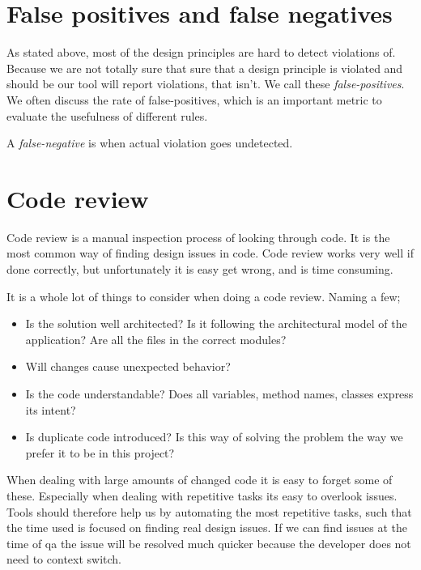 \documentclass{report}
\begin{document}
\section{False positives and false negatives}
As stated above, most of the design principles are hard to detect violations of. Because we are not totally sure that sure that a design principle is violated and should be our tool will report violations, that isn't. We call these \textit{false-positives}. We often discuss the rate of false-positives, which is an important metric to evaluate the usefulness of different rules.

A \textit{false-negative} is when actual violation goes undetected. 



\section{Code review}
\label{code-review}
Code review is a manual inspection process of looking through code. It is the most common way of finding design issues in code. Code review works very well if done correctly, but unfortunately it is easy get wrong, and is time consuming. 

It is a whole lot of things to consider when doing a code review. Naming a few;

\begin{itemize}
    \item Is the solution well architected? Is it following the architectural model of the application? Are all the files in the correct modules?
    \item Will changes cause unexpected behavior? 
    \item Is the code understandable? Does all variables, method names, classes express its intent?
    \item Is duplicate code introduced? Is this way of solving the problem the way we prefer it to be in this project?
\end{itemize}

When dealing with large amounts of changed code it is easy to forget some of these. Especially when dealing with repetitive tasks its easy to overlook issues. Tools should therefore help us by automating the most repetitive tasks, such that the time used is focused on finding real design issues. If we can find issues at the time of \gls{qa} the issue will be resolved much quicker because the developer does not need to context switch.
\end{document}

